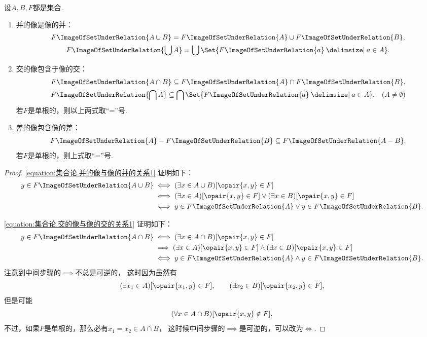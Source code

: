 \begin{theorem}
设\(A,B,F\)都是集合.
\def\F#1{F\ImageOfSetUnderRelation{#1}}
\begin{enumerate}
	\item 并的像是像的并：\begin{gather}
		\F{A \cup B}
		= \F{A} \cup \F{B},
		\label{equation:集合论.并的像与像的并的关系1} \\
		\F{\bigcup A}
		= \bigcup\Set{ \F{a} \given a \in A }.
		\label{equation:集合论.并的像与像的并的关系2}
	\end{gather}

	\item 交的像包含于像的交：\begin{gather}
		\F{A \cap B}
		\subseteq \F{A} \cap \F{B},
		\label{equation:集合论.交的像与像的交的关系1} \\
		\F{\bigcap A}
		\subseteq \bigcap\Set{ \F{a} \given a \in A }.
		\label{equation:集合论.交的像与像的交的关系2}
		\quad(A \neq \emptyset)
	\end{gather}
	若\(F\)是单根的，则以上两式取“=”号.

	\item 差的像包含像的差：\begin{equation}
		\F{A} - \F{B}
		\subseteq \F{A-B}.
		\label{equation:集合论.差的像与像的差的关系}
	\end{equation}
	若\(F\)是单根的，则上式取“=”号.
\end{enumerate}
\begin{proof}
\cref{equation:集合论.并的像与像的并的关系1} 证明如下：
\begin{align*}
	y \in \F{A \cup B}
	&\iff (\exists x \in A \cup B)[\opair{x,y} \in F] \\
	&\iff (\exists x \in A)[\opair{x,y} \in F]
			\lor (\exists x \in B)[\opair{x,y} \in F] \\
	&\iff y \in \F{A} \lor y \in \F{B}.
\end{align*}

\cref{equation:集合论.交的像与像的交的关系1} 证明如下：
\begin{align*}
	y \in \F{A \cap B}
	&\iff (\exists x \in A \cap B)[\opair{x,y} \in F] \\
	&\implies (\exists x \in A)[\opair{x,y} \in F]
		\land (\exists x \in B)[\opair{x,y} \in F] \\
	&\iff y \in \F{A} \land y \in \F{B}.
\end{align*}
注意到中间步骤的\(\implies\)不总是可逆的，
这时因为虽然有\[
	(\exists x_1 \in A)[\opair{x_1,y} \in F], \qquad
	(\exists x_2 \in B)[\opair{x_2,y} \in F],
\]
但是可能\[
	(\forall x \in A \cap B)[\opair{x,y} \notin F].
\]
不过，如果\(F\)是单根的，那么必有\(x_1 = x_2 \in A \cap B\)，
这时候中间步骤的\(\implies\)是可逆的，可以改为\(\iff\).


\end{proof}
\end{theorem}
